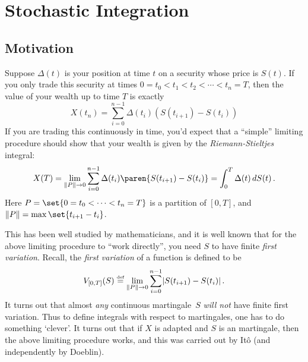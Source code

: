 
\ifstandalonechapter\setcounter{chapter}{2}\fi
\chapter{Stochastic Integration}

\section{Motivation}
Suppose $\Delta(t)$ is your position at time $t$ on a security whose price is $S(t)$.
If you only trade this security at times $0 = t_0 < t_1 < t_2 < \cdots < t_n = T$, then the value of your wealth up to time $T$ is exactly
\begin{equation*}
  X(t_n) = \sum_{i=0}^{n-1} \Delta(t_i) ( S(t_{i+1}) - S(t_i) )
\end{equation*}
If you are trading this continuously in time, you'd expect that a ``simple'' limiting procedure should show that your wealth is given by the \emph{Riemann-Stieltjes} integral:
\begin{equation*}%
  X(T) = 
    \lim_{\norm{P} \to 0}
      \sum_{i=0}^{n-1} \Delta(t_i) \paren{ S( t_{i+1} ) - S( t_i ) }
    = \int_0^T \Delta(t) \, dS(t) \,.
\end{equation*}
Here $P = \set{0 = t_0 < \cdots < t_n = T}$ is a partition of $[0, T]$, and $\norm{P} = \max\set{ t_{i+1} - t_i }$.


This has been well studied by mathematicians, and it is well known that for the above limiting procedure to ``work directly'', you need $S$ to have finite \emph{first variation}.
Recall, the \emph{first variation} of a function is defined to be
\begin{equation*}
  V_{[0,T]}(S) \stackrel{\scriptscriptstyle\textup{def}}{=} \lim_{\lVert P\rVert \to 0} \sum_{i=0}^{n-1} \lvert S(t_{i+1}) - S(t_i)\rvert\,.
\end{equation*}
It turns out that almost \emph{any} continuous martingale~$S$ \emph{will not} have finite first variation.
Thus to define integrals with respect to martingales, one has to do something `clever'.
It turns out that if $X$ is adapted and $S$ is an martingale, then the above limiting procedure works, and this was carried out by It\^o (and independently by Doeblin).

